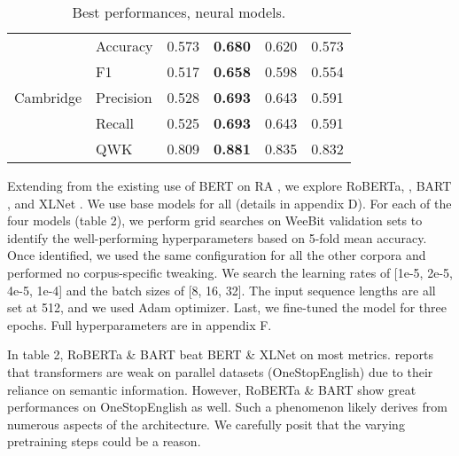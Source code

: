 \documentclass[11pt]{article}
\begin{document}
\begin{table}[]
{\begin{tabular}{cl|cccc}
    \multirow{5}{*}{Cambridge}   &Accuracy   &0.573            &\textbf{0.680}    &0.620                &0.573               \\
                                 &F1         &0.517            &\textbf{0.658}    &0.598                &0.554               \\
                                 &Precision  &0.528            &\textbf{0.693}    &0.643                &0.591               \\
                                 &Recall     &0.525            &\textbf{0.693}    &0.643                &0.591               \\
                                 &QWK        &0.809            &\textbf{0.881}    &0.835                &0.832               \\\cmidrule(lr){1-6}
    \cmidrule(lr){1-6}
    \end{tabular}
    }
\caption{\label{Append} Best performances, neural models.}
\end{table}
Extending from the existing use of BERT on RA \citep{deutsch-etal-2020-linguistic,Martinc:21}, we explore RoBERTa, \citep{liu2019roberta}, BART \citep{bart}, and XLNet \citep{XLNET:19}. We use base models for all (details in appendix D). For each of the four models (table 2), we perform grid searches on WeeBit validation sets to identify the well-performing hyperparameters based on 5-fold mean accuracy. Once identified, we used the same configuration for all the other corpora and performed no corpus-specific tweaking. We search the learning rates of [1e-5, 2e-5, 4e-5, 1e-4] and the batch sizes of [8, 16, 32]. The input sequence lengths are all set at 512, and we used Adam optimizer. Last, we fine-tuned the model for three epochs. Full hyperparameters are in appendix F.

In table 2, RoBERTa \& BART beat BERT \& XLNet on most metrics. \citet{Martinc:21} reports that transformers are weak on parallel datasets (OneStopEnglish) due to their reliance on semantic information. However, RoBERTa \& BART show great performances on OneStopEnglish as well. Such a phenomenon likely derives from numerous aspects of the architecture. We carefully posit that the varying pretraining steps could be a reason. 
\end{document}
